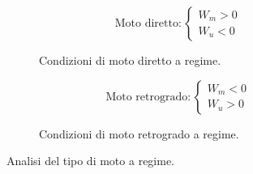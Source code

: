 \documentclass[main.tex]{subfiles}
\begin{document}
\begin{figure}[H]
  \begin{subfigure}[b]{.5\textwidth}
  \centering
  \[
	\text{Moto diretto}: \begin{cases}
		W_m > 0 \\
		W_u < 0
	\end{cases}  
  \]
  \caption{Condizioni di moto diretto a regime.}
  \end{subfigure}
  \hfill
  \begin{subfigure}[b]{.5\textwidth}
  \centering
  \[
	\text{Moto retrogrado}: \begin{cases}
		W_m < 0 \\
		W_u > 0
	\end{cases}    
  \]
  \caption{Condizioni di moto retrogrado a regime.}
  \end{subfigure}
  \caption{Analisi del tipo di moto a regime.}
\end{figure}
\end{document}
